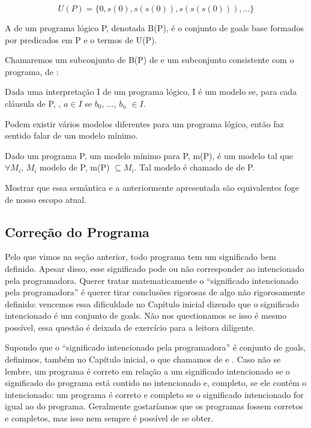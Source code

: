 \[
U(P) = \{0, s(0), s(s(0)), s(s(s(0))), ...\}
\]

\begin{definition} A  de um programa lógico
  P, denotada B(P), é o conjunto de goals base formados por predicados
  em P e o termos de U(P). 
\end{definition}

  Chamaremos um subconjunto de B(P) de  e um
  subconjunto consistente com o programa, de :

\begin{definition} Dada uma interpretação I de um programa lógico, I é
  um modelo se, para cada cláusula de P, , $a \in I$ se $b_0$, ..., $b_n$ $\in I$. 
\end{definition}

 Podem existir vários modelos diferentes para um programa lógico,
 então faz sentido falar de um modelo mínimo.

\begin{definition} Dado um programa P, um modelo mínimo para P, m(P),
  é um modelo tal que $\forall M_i$, $M_i$ modelo de P, m(P)
  $\subseteq M_i$. Tal modelo é chamado de  de P. 
\end{definition}

Mostrar que essa semântica e a anteriormente apresentada são
equivalentes foge de nosso escopo atual.

\subsection{Correção do Programa}

Pelo que vimos na seção anterior, todo programa tem um significado bem
definido. Apesar disso, esse significado pode ou não corresponder ao
intencionado pela programadora. Querer tratar matematicamente o
``significado intencionado pela programadora'' é querer tirar
conclusões rigorosas de algo não rigorosamente definido: vencemos essa
dificuldade no Capítulo inicial dizendo que o significado intencionado
é um conjunto de goals. Não nos questionamos se isso é mesmo possível,
essa questão é deixada de exercício para a leitora diligente.

Supondo que o ``significado intencionado pela programadora'' é
conjunto de goals, definimos, também no Capítulo inicial, o que
chamamos de  e . Caso não se lembre, um programa é correto em relação a um
significado intencionado se o significado do programa está contido no
intencionado e, completo, se ele contém o intencionado: um programa é
correto e completo se o significado intencionado for igual ao do
programa.  Geralmente gostaríamos que os programas fossem corretos e
completos, mas isso nem sempre é possível de se obter.

